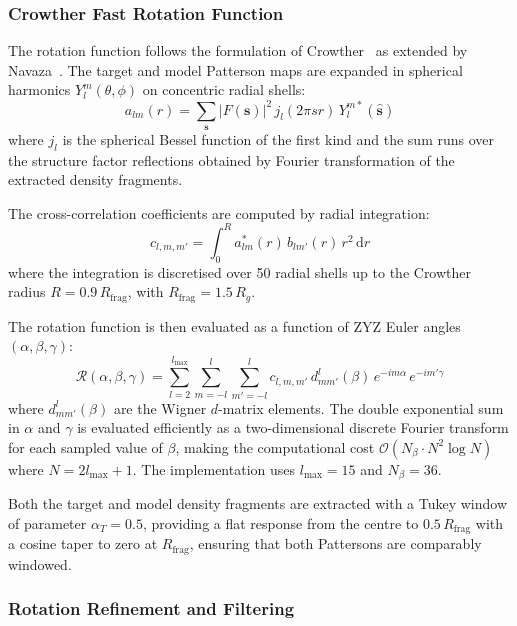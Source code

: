 \subsubsection{Crowther Fast Rotation Function}

The rotation function follows the formulation of
Crowther~\cite{Crowther1972} as extended by Navaza~\cite{Navaza1994}.
The target and model Patterson maps are expanded in spherical harmonics
$Y_l^m(\theta, \phi)$ on concentric radial shells:
%
\begin{equation}
  a_{lm}(r) = \sum_{\mathbf{s}} |F(\mathbf{s})|^2\, j_l(2\pi s r)\,
    Y_l^{m*}(\hat{\mathbf{s}})
\end{equation}
%
where $j_l$ is the spherical Bessel function of the first kind and the
sum runs over the structure factor reflections obtained by Fourier
transformation of the extracted density fragments.

The cross-correlation coefficients are computed by radial integration:
%
\begin{equation}
  c_{l,m,m'} = \int_0^R a_{lm}^*(r)\, b_{lm'}(r)\, r^2\, \mathrm{d}r
\end{equation}
%
where the integration is discretised over 50 radial shells up to the
Crowther radius $R = 0.9\,R_\text{frag}$, with
$R_\text{frag} = 1.5\,R_g$.

The rotation function is then evaluated as a function of ZYZ Euler
angles $(\alpha, \beta, \gamma)$:
%
\begin{equation}
  \mathcal{R}(\alpha, \beta, \gamma) = \sum_{l=2}^{l_\text{max}}
    \sum_{m=-l}^{l} \sum_{m'=-l}^{l}
    c_{l,m,m'}\, d^l_{mm'}(\beta)\,
    e^{-im\alpha}\, e^{-im'\gamma}
\end{equation}
%
where $d^l_{mm'}(\beta)$ are the Wigner $d$-matrix elements. The
double exponential sum in $\alpha$ and $\gamma$ is evaluated
efficiently as a two-dimensional discrete Fourier transform for each
sampled value of $\beta$, making the computational cost
$\mathcal{O}(N_\beta \cdot N^2 \log N)$ where $N = 2l_\text{max}+1$.
The implementation uses $l_\text{max}=15$ and $N_\beta=36$.

Both the target and model density fragments are extracted with a Tukey
window of parameter $\alpha_T = 0.5$, providing a flat response from
the centre to $0.5\,R_\text{frag}$ with a cosine taper to zero at
$R_\text{frag}$, ensuring that both Pattersons are comparably
windowed.

\subsubsection{Rotation Refinement and Filtering}

